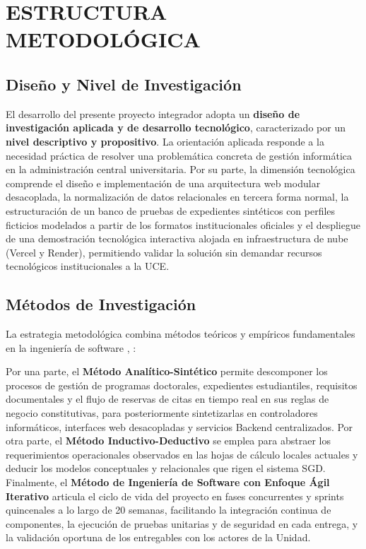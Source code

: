
\section{ESTRUCTURA METODOLÓGICA}

\subsection{Diseño y Nivel de Investigación}

El desarrollo del presente proyecto integrador adopta un \textbf{diseño de investigación aplicada y de desarrollo tecnológico}, caracterizado por un \textbf{nivel descriptivo y propositivo}. La orientación aplicada responde a la necesidad práctica de resolver una problemática concreta de gestión informática en la administración central universitaria. Por su parte, la dimensión tecnológica comprende el diseño e implementación de una arquitectura web modular desacoplada, la normalización de datos relacionales en tercera forma normal, la estructuración de un banco de pruebas de expedientes sintéticos con perfiles ficticios modelados a partir de los formatos institucionales oficiales y el despliegue de una demostración tecnológica interactiva alojada en infraestructura de nube (Vercel y Render), permitiendo validar la solución sin demandar recursos tecnológicos institucionales a la UCE.

\subsection{Métodos de Investigación}

La estrategia metodológica combina métodos teóricos y empíricos fundamentales en la ingeniería de software \cite{pressman_eng}, \cite{sommerville_eng}:

Por una parte, el \textbf{Método Analítico-Sintético} permite descomponer los procesos de gestión de programas doctorales, expedientes estudiantiles, requisitos documentales y el flujo de reservas de citas en tiempo real en sus reglas de negocio constitutivas, para posteriormente sintetizarlas en controladores informáticos, interfaces web desacopladas y servicios Backend centralizados. Por otra parte, el \textbf{Método Inductivo-Deductivo} se emplea para abstraer los requerimientos operacionales observados en las hojas de cálculo locales actuales y deducir los modelos conceptuales y relacionales que rigen el sistema SGD. Finalmente, el \textbf{Método de Ingeniería de Software con Enfoque Ágil Iterativo} articula el ciclo de vida del proyecto en fases concurrentes y sprints quincenales a lo largo de 20 semanas, facilitando la integración continua de componentes, la ejecución de pruebas unitarias y de seguridad en cada entrega, y la validación oportuna de los entregables con los actores de la Unidad.

